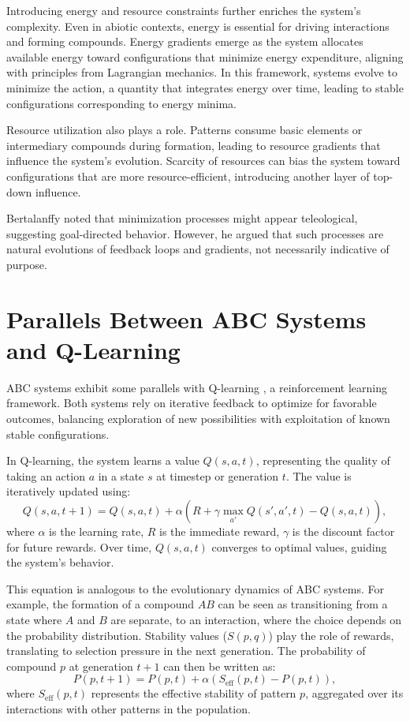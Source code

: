 \documentclass[entropy,article,submit,pdftex,moreauthors]{Definitions/mdpi}
\begin{document}
Introducing energy and resource constraints further enriches the system's complexity. Even in abiotic contexts, energy is essential for driving interactions and forming compounds. Energy gradients emerge as the system allocates available energy toward configurations that minimize energy expenditure, aligning with principles from Lagrangian mechanics. In this framework, systems evolve to minimize the action, a quantity that integrates energy over time, leading to stable configurations corresponding to energy minima. 

Resource utilization also plays a role. Patterns consume basic elements or intermediary compounds during formation, leading to resource gradients that influence the system's evolution. Scarcity of resources can bias the system toward configurations that are more resource-efficient, introducing another layer of top-down influence.

Bertalanffy \cite{bertalanffy1968general} noted that minimization processes might appear teleological, suggesting goal-directed behavior. However, he argued that such processes are natural evolutions of feedback loops and gradients, not necessarily indicative of purpose.

\section{Parallels Between ABC Systems and Q-Learning}

ABC systems exhibit some parallels with Q-learning \cite{sutton2018reinforce}, a reinforcement learning framework. Both systems rely on iterative feedback to optimize for favorable outcomes, balancing exploration of new possibilities with exploitation of known stable configurations.

In Q-learning, the system learns a value \( Q(s, a, t) \), representing the quality of taking an action \( a \) in a state \( s \) at timestep or generation \( t \). The value is iteratively updated using:
\[
Q(s, a, t+1) = Q(s, a, t) + \alpha \left( R + \gamma \max_{a'} Q(s', a', t) - Q(s, a, t) \right),
\]
where \( \alpha \) is the learning rate, \( R \) is the immediate reward, \( \gamma \) is the discount factor for future rewards. Over time, \( Q(s, a, t) \) converges to optimal values, guiding the system's behavior.

This equation is analogous to the evolutionary dynamics of ABC systems. For example, the formation of a compound \( AB \) can be seen as transitioning from a state where \( A \) and \( B \) are separate, to an interaction, where the choice depends on the probability distribution. Stability values (\( S(p, q) \)) play the role of rewards, translating to selection pressure in the next generation. The probability of compound \( p \) at generation \( t+1 \) can then be written as:
\[
P(p, t+1) = P(p, t) + \alpha \left( S_{\text{eff}}(p, t) - P(p, t) \right),
\]
where \( S_{\text{eff}}(p, t) \) represents the effective stability of pattern \( p \), aggregated over its interactions with other patterns in the population.
\end{document}
